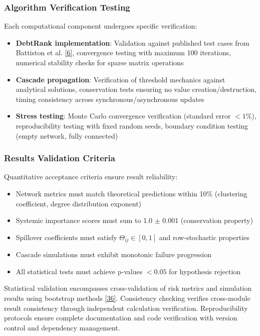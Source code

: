 \documentclass[a4 paper, 11pt,twoside]{article}
\newcommand{\0}{\Bf{0}}
\theoremstyle{definition}
\begin{document}
\subsubsection{Algorithm Verification Testing}

Each computational component undergoes specific verification:
\begin{itemize}
\item \textbf{DebtRank implementation}: Validation against published test cases from Battiston et al. \hyperref[ref6]{[6]}, convergence testing with maximum 100 iterations, numerical stability checks for sparse matrix operations
\item \textbf{Cascade propagation}: Verification of threshold mechanics against analytical solutions, conservation tests ensuring no value creation/destruction, timing consistency across synchronous/asynchronous updates
\item \textbf{Stress testing}: Monte Carlo convergence verification (standard error $< 1\%$), reproducibility testing with fixed random seeds, boundary condition testing (empty network, fully connected)
\end{itemize}

\subsubsection{Results Validation Criteria}

Quantitative acceptance criteria ensure result reliability:
\begin{itemize}
\item Network metrics must match theoretical predictions within 10\% (clustering coefficient, degree distribution exponent)
\item Systemic importance scores must sum to 1.0 $\pm$ 0.001 (conservation property)
\item Spillover coefficients must satisfy $\Theta_{ij} \in [0,1]$ and row-stochastic properties
\item Cascade simulations must exhibit monotonic failure progression
\item All statistical tests must achieve p-values $< 0.05$ for hypothesis rejection
\end{itemize}

Statistical validation encompasses cross-validation of risk metrics and simulation results using bootstrap methods \hyperref[ref36]{[36]}. Consistency checking verifies cross-module result consistency through independent calculation verification. Reproducibility protocols ensure complete documentation and code verification with version control and dependency management.
\end{document}
